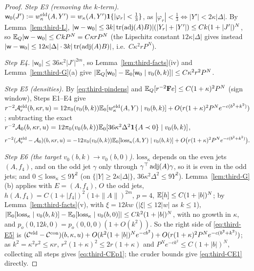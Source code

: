 \begin{proof}
\emph{Step E3 (removing the $k$-term).} $\mathsf w_0(J'):=w^{\mathrm{eld}}_\kappa(A,Y')=w_\kappa(A,Y')\mathbf 1\{|\varphi_r|<\frac13\}$, as $|\varphi_r|<\frac13\iff|Y'|<2\kappa|\Delta|$. By Lemma~\ref{lem:third-L}, $|\mathsf w-\mathsf w_0|\le3k|\operatorname{tr}(\operatorname{adj}(A)B)|(|Y_r|+|Y'|)\le Ck(1+|J'|)^N$, so $\mathbb E_Q|\mathsf w-\mathsf w_0|\le CkP^N=C\kappa rP^N$ (the Lipschitz constant $12\kappa|\Delta|$ gives instead $|\mathsf w-\mathsf w_0|\le12\kappa|\Delta|\cdot3k|\operatorname{tr}(\operatorname{adj}(A)B)|$, i.e.\ $C\kappa^2rP^N$).

\emph{Step E4.} $|\mathsf w_0|\le36\kappa^2|J'|^{2m}$, so Lemma~\ref{lem:third-facts}(iv) and Lemma~\ref{lem:third-G}(a) give $|\mathbb E_Q[\mathsf w_0]-\mathbb E_0[\mathsf w_0\mid v_0(b,k)]|\le C\kappa^2r^2P^N$.

\emph{Step E5 (densities).} By \eqref{eq:third-pindens} and $\mathbb E_Q[r^{-2}\mathbf Fe]\le C(1+\kappa)^2P^N$ (sign window), Steps E1--E4 give $r^{-2}\mathcal A^{\mathrm{eld}}_r(b,\kappa r,u)=12\pi_0(v_0(b,k))\mathbb E_0[w^{\mathrm{eld}}_\kappa(A,Y)\mid v_0(b,k)]+O(r(1+\kappa)^2P^Ne^{-c(b^2+k^2)})$; subtracting the exact $r^{-2}\mathcal A_0(b,\kappa r,u)=12\pi_0(v_0(b,k))\mathbb E_0[36\kappa^2\Delta^2\mathbf 1\{A\prec0\}\mid v_0(b,k)]$,
\begin{equation}\label{eq:third-E5}
r^{-2}(\mathcal A^{\mathrm{eld}}_r-\mathcal A_0)(b,\kappa r,u)=-12\pi_0(v_0(b,k))\mathbb E_0[\mathrm{loss}_\kappa(A,Y)\mid v_0(b,k)]+O\bigl(r(1+\kappa)^2P^Ne^{-c(b^2+k^2)}\bigr).
\end{equation}

\emph{Step E6 (the target $v_0(b,k)\to v_0(b,0)$).} $\mathrm{loss}_\kappa$ depends on the even jets $(A,f_4)$, and on the odd jet $\gamma$ only through $\gamma^\top\operatorname{adj}(A)\gamma$, so it is even in the odd jets; and $0\le\mathrm{loss}_\kappa\le9Y^2$ (on $\{|Y|\ge2\kappa|\Delta|\}$, $36\kappa^2\Delta^2\le9Y^2$). Lemma~\ref{lem:third-G}(b) applies with $E=(A,f_4)$, $O$ the odd jets, $h(A,f_4)=C(1+|f_4|)^2(1+\|A\|)^{2m}$, $p=4$, $\mathbb E[h]\le C(1+|b|)^N$; by Lemma~\ref{lem:third-facts}(v), with $\xi=12kw$ ($|\xi|\le12|w|$ as $k\le1$), $|\mathbb E_0[\mathrm{loss}_\kappa\mid v_0(b,k)]-\mathbb E_0[\mathrm{loss}_\kappa\mid v_0(b,0)]|\le Ck^2(1+|b|)^N$, with no growth in $\kappa$, and $p_o(0,12k,0)=p_o(0,0,0)(1+O(k^2))$. So the right side of \eqref{eq:third-E5} is $(\mathcal C^{\mathrm{eld}}-\mathcal C^{\rm con})(b,\kappa,u)+O(k^2(1+|b|)^Ne^{-cb^2})+O(r(1+\kappa)^2P^Ne^{-c(b^2+k^2)})$; as $k^2=\kappa^2r^2\le\kappa r$, $r^2(1+\kappa)^2\le2r(1+\kappa)$ and $P^Ne^{-ck^2}\le C(1+|b|)^N$, collecting all steps gives \eqref{eq:third-CEp1}; the cruder bounds give \eqref{eq:third-CE1} directly. 
\end{proof}

